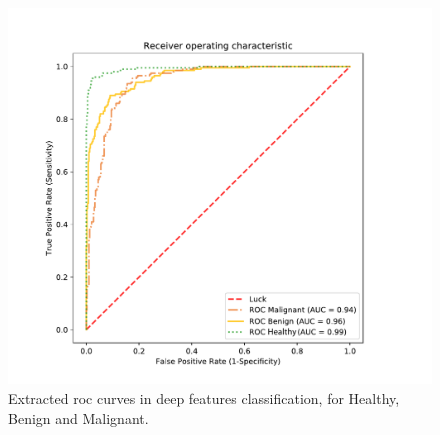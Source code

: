 \begin{figure}[h]
\centering
    \includegraphics[width=\linewidth]{content/figures/ROC.pdf}
    \caption{Extracted \ac{roc} curves in deep features classification, for Healthy, Benign and Malignant.}
    \label{fig:roc}
\end{figure}